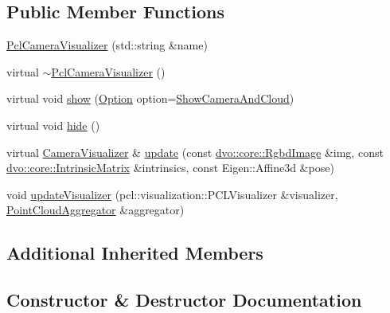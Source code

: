 \subsection*{Public Member Functions}
\begin{DoxyCompactItemize}
\item 
\mbox{\hyperlink{classdvo_1_1visualization_1_1internal_1_1_pcl_camera_visualizer_a4990540496b6a8104b6f3d794ed2bb17}{Pcl\+Camera\+Visualizer}} (std\+::string \&name)
\item 
virtual \mbox{\hyperlink{classdvo_1_1visualization_1_1internal_1_1_pcl_camera_visualizer_a594001de77ac60de8cd05a03d1314b8e}{$\sim$\+Pcl\+Camera\+Visualizer}} ()
\item 
virtual void \mbox{\hyperlink{classdvo_1_1visualization_1_1internal_1_1_pcl_camera_visualizer_a09b5d8117f8ca15489ac42f6b6019030}{show}} (\mbox{\hyperlink{classdvo_1_1visualization_1_1_camera_visualizer_a0526f50be9f298c4f7d1f91018d50af7}{Option}} option=\mbox{\hyperlink{classdvo_1_1visualization_1_1_camera_visualizer_a0526f50be9f298c4f7d1f91018d50af7a0ff8fc7d7283f27066e93ca0d4ef3f19}{Show\+Camera\+And\+Cloud}})
\item 
virtual void \mbox{\hyperlink{classdvo_1_1visualization_1_1internal_1_1_pcl_camera_visualizer_ad261307239a87bc10ba4d0662960cc72}{hide}} ()
\item 
virtual \mbox{\hyperlink{classdvo_1_1visualization_1_1_camera_visualizer}{Camera\+Visualizer}} \& \mbox{\hyperlink{classdvo_1_1visualization_1_1internal_1_1_pcl_camera_visualizer_adfe2b8752f78ee0fa6ee193be70941eb}{update}} (const \mbox{\hyperlink{structdvo_1_1core_1_1_rgbd_image}{dvo\+::core\+::\+Rgbd\+Image}} \&img, const \mbox{\hyperlink{structdvo_1_1core_1_1_intrinsic_matrix}{dvo\+::core\+::\+Intrinsic\+Matrix}} \&intrinsics, const Eigen\+::\+Affine3d \&pose)
\item 
void \mbox{\hyperlink{classdvo_1_1visualization_1_1internal_1_1_pcl_camera_visualizer_adbc6ea5a07dace4e06773d568986424b}{update\+Visualizer}} (pcl\+::visualization\+::\+P\+C\+L\+Visualizer \&visualizer, \mbox{\hyperlink{classdvo_1_1visualization_1_1_point_cloud_aggregator}{Point\+Cloud\+Aggregator}} \&aggregator)
\end{DoxyCompactItemize}
\subsection*{Additional Inherited Members}


\subsection{Constructor \& Destructor Documentation}
\mbox{\label{classdvo_1_1visualization_1_1internal_1_1_pcl_camera_visualizer_a4990540496b6a8104b6f3d794ed2bb17}} 
